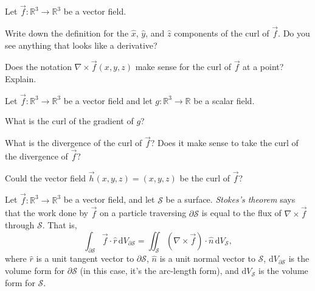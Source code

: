 \documentclass{problemset}
\newcommand{\R}{\mathbb{R}}
\renewcommand{\d}{\mathrm{d}}
\begin{document}
	\question
	Let $\vec f:\R^3\to\R^3$ be a vector field.
	\begin{parts}
		\item Write down the definition
			for the $\hat x$, $\hat y$, and $\hat z$ components of the curl of $\vec f$.
			Do you see anything that looks like a derivative?
		\item Does the notation $\nabla \times \vec f(x,y,z)$ make sense for the curl of
			$\vec f$ at a point?  Explain.
	\end{parts}

	\question
	Let $\vec f:\R^3\to\R^3$ be a vector field and let $g:\R^3\to \R$ be a scalar field.
	\begin{parts}
		\item What is the curl of the gradient of $g$?
		\item What is the divergence of the curl of $\vec f$?  Does it
			make sense to take the curl of the divergence of $\vec f$?
		\item Could the vector field $\vec h(x,y,z) = (x,y,z)$ be the curl
			of $\vec f$?
	\end{parts}

	\begin{theorem}
		Let $\vec f:\R^3\to\R^3$ be a vector field, and let $\mathcal S$ be a surface.
		\emph{Stokes's theorem} says that the work done by $\vec f$ on a particle traversing 
		$\partial \mathcal S$ is equal to the flux of $\nabla \times \vec f$ through $\mathcal S$.
		That is,
		\[
			\int_{\partial \mathcal S} \vec f\cdot \hat r\,\d V_{\partial \mathcal S}
			= \iint_{\mathcal S} (\nabla \times \vec f)\cdot \hat n\,\d V_{\mathcal S},
		\]
		where $\hat r$ is a unit tangent vector to $\partial \mathcal S$, $\hat n$ is a unit
		normal vector to $\mathcal S$, $\d V_{\partial \mathcal S}$ is the volume form
		for $\partial \mathcal S$ (in this case, it's the arc-length form), and 
		$\d V_{\mathcal S}$ is the volume form for $\mathcal S$.

	\end{theorem}
\end{document}
